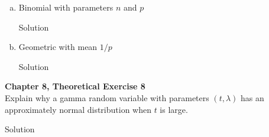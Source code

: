 \documentclass{article}
\begin{document}
\begin{spacing}{1.1}
\begin{homeworkProblem}
\begin{enumerate}[(a)]
\begin{homeworkSection}{Solution}
      \end{homeworkSection}
    \item Binomial with parameters $n$ and $p$
      \begin{homeworkSection}{Solution}
      
      \end{homeworkSection}
    \item Geometric with mean $1/p$
      \begin{homeworkSection}{Solution}
      
      \end{homeworkSection}
  \end{enumerate}
\end{homeworkProblem}

\newpage
\begin{homeworkProblem}
  {\bf Chapter 8, Theoretical Exercise 8}\\
  Explain why a gamma random variable with parameters $(t, \lambda)$ has 
  an approximately normal distribution when $t$ is large.
  \begin{homeworkSection}{Solution}
    
  \end{homeworkSection}
\end{homeworkProblem}


\end{spacing}
\end{document}
